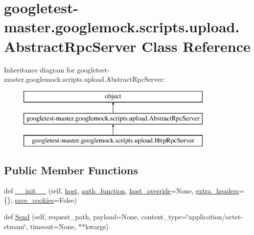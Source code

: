 \hypertarget{classgoogletest-master_1_1googlemock_1_1scripts_1_1upload_1_1_abstract_rpc_server}{}\section{googletest-\/master.googlemock.\+scripts.\+upload.\+Abstract\+Rpc\+Server Class Reference}
\label{classgoogletest-master_1_1googlemock_1_1scripts_1_1upload_1_1_abstract_rpc_server}
Inheritance diagram for googletest-\/master.googlemock.\+scripts.\+upload.\+Abstract\+Rpc\+Server\+:\begin{figure}[H]
\begin{center}
\leavevmode
\includegraphics[height=3.000000cm]{de/d16/classgoogletest-master_1_1googlemock_1_1scripts_1_1upload_1_1_abstract_rpc_server}
\end{center}
\end{figure}
\subsection*{Public Member Functions}
\begin{DoxyCompactItemize}
\item 
def \mbox{\hyperlink{classgoogletest-master_1_1googlemock_1_1scripts_1_1upload_1_1_abstract_rpc_server_ae3edd194f5ff2aee2be42edbebb95ad1}{\+\_\+\+\_\+init\+\_\+\+\_\+}} (self, \mbox{\hyperlink{classgoogletest-master_1_1googlemock_1_1scripts_1_1upload_1_1_abstract_rpc_server_afd4c00da1cf5c7ed2b7bfd739783c8b6}{host}}, \mbox{\hyperlink{classgoogletest-master_1_1googlemock_1_1scripts_1_1upload_1_1_abstract_rpc_server_a8ce5357a1fae257835ba640c0b7ff708}{auth\+\_\+function}}, \mbox{\hyperlink{classgoogletest-master_1_1googlemock_1_1scripts_1_1upload_1_1_abstract_rpc_server_a0bf88e095fde3c9ea6bc5c4411ce38b4}{host\+\_\+override}}=None, \mbox{\hyperlink{classgoogletest-master_1_1googlemock_1_1scripts_1_1upload_1_1_abstract_rpc_server_a5be102aa6b94ff7a73543bab993f468d}{extra\+\_\+headers}}=\{\}, \mbox{\hyperlink{classgoogletest-master_1_1googlemock_1_1scripts_1_1upload_1_1_abstract_rpc_server_a5ef9424193719b3eb3acb5f5e2b61c67}{save\+\_\+cookies}}=False)
\item 
def \mbox{\hyperlink{classgoogletest-master_1_1googlemock_1_1scripts_1_1upload_1_1_abstract_rpc_server_afc2f51f5c9a7503f0dda5c723ab869fd}{Send}} (self, request\+\_\+path, payload=None, content\+\_\+type=\char`\"{}application/octet-\/stream\char`\"{}, timeout=None, $\ast$$\ast$kwargs)
\end{DoxyCompactItemize}
